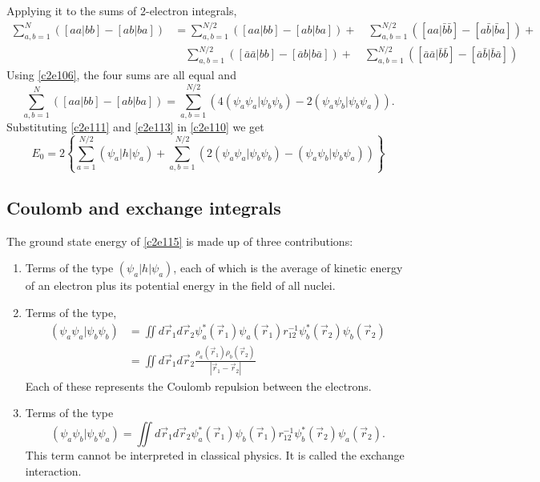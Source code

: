Applying it to the sums of 2-electron integrals,
\begin{equation}\label{c2e113}
\begin{aligned}
\sum_{a,b=1}^N([aa|bb]-[ab|ba]) &= \sum_{a,b=1}^{N/2}([aa|bb]-[ab|ba]) + 
 \quad\sum_{a,b=1}^{N/2}([aa|\bar{b}\bar{b}]-[a\bar{b}|\bar{b}a]) + \\
 &\quad\sum_{a,b=1}^{N/2}([\bar{a}\bar{a}|bb]-[\bar{a}b|b\bar{a}]) + 
 \quad\sum_{a,b=1}^{N/2}([\bar{a}\bar{a}|\bar{b}\bar{b}]-
 [\bar{a}\bar{b}|\bar{b}\bar{a}])
\end{aligned}
\end{equation}
Using \eqref{c2e106}, the four sums are all equal and
\begin{equation}\label{c1e114}
\sum_{a,b=1}^N([aa|bb] - [ab|ba]) = \sum_{a,b=1}^{N/2}
\left(4(\psi_a\psi_a|\psi_b\psi_b) -2 (\psi_a\psi_b|\psi_b\psi_a)\right).
\end{equation}
Substituting \eqref{c2e111} and \eqref{c2e113} in \eqref{c2e110} we get
\begin{equation}\label{c2e115}
E_0 = 2\left\{\sum_{a=1}^{N/2}(\psi_a|h|\psi_a) + \sum_{a,b=1}^{N/2}
\left(2(\psi_a\psi_a|\psi_b\psi_b) - (\psi_a\psi_b|\psi_b\psi_a)\right)\right\}
\end{equation}

\subsection{Coulomb and exchange integrals}
The ground state energy of \eqref{c2e115} is made up of three contributions:
\begin{enumerate}
\item Terms of the type $(\psi_a|h|\psi_a)$, each of which is the average of
kinetic energy of an electron plus its potential energy in the field of all
nuclei.
\item Terms of the type,
\[
\begin{aligned}
(\psi_a\psi_a|\psi_b\psi_b) &= \iint d\vec{r}_1 d\vec{r}_2\psi_a^\ast(\vec{r}_1)
\psi_a(\vec{r}_1)r_{12}^{-1}\psi_b^\ast(\vec{r}_2)\psi_b(\vec{r}_2) \\
&= \iint d\vec{r}_1 d\vec{r}_2 \frac{\rho_a(\vec{r}_1)\rho_b(\vec{r}_2)}{|\vec{r}_1
- \vec{r}_2|}
\end{aligned}
\]
Each of these represents the Coulomb repulsion between the electrons.
\item Terms of the type
\[
(\psi_a\psi_b|\psi_b\psi_a) = \iint d\vec{r}_1 d\vec{r}_2\psi_a^\ast(\vec{r}_1)
\psi_b(\vec{r}_1)r_{12}^{-1}\psi_b^\ast(\vec{r}_2)\psi_a(\vec{r}_2).
\]
This term cannot be interpreted in classical physics. It is called the 
exchange interaction.
\end{enumerate}

